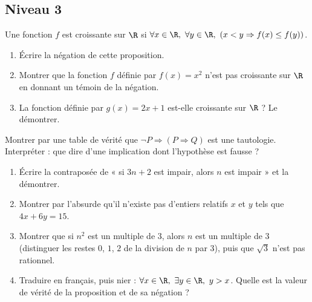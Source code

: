 \subsection*{Niveau 3}
\begin{exercise}
Une fonction $f$ est croissante sur $\R$ si $\forall x\in\R,\ \forall y\in\R,\ (x<y\Rightarrow f(x)\le f(y))$.
\begin{enumerate}
\item Écrire la négation de cette proposition.
\item Montrer que la fonction $f$ définie par $f(x)=x^2$ n'est pas croissante sur $\R$ en donnant un témoin de la négation.
\item La fonction définie par $g(x)=2x+1$ est-elle croissante sur $\R$ ? Le démontrer.
\end{enumerate}
\end{exercise}
\begin{exercise}
Montrer par une table de vérité que $\lnot P\Rightarrow(P\Rightarrow Q)$ est une tautologie. Interpréter : que dire d'une implication dont l'hypothèse est fausse ?
\end{exercise}
\begin{beyond}
\begin{enumerate}
\item Écrire la contraposée de « si $3n+2$ est impair, alors $n$ est impair » et la démontrer.
\item Montrer par l'absurde qu'il n'existe pas d'entiers relatifs $x$ et $y$ tels que $4x+6y=15$.
\item Montrer que si $n^2$ est un multiple de $3$, alors $n$ est un multiple de $3$ (distinguer les restes $0$, $1$, $2$ de la division de $n$ par $3$), puis que $\sqrt3$ n'est pas rationnel.
\item Traduire en français, puis nier : $\forall x\in\R,\ \exists y\in\R,\ y>x$. Quelle est la valeur de vérité de la proposition et de sa négation ?
\end{enumerate}
\end{beyond}

